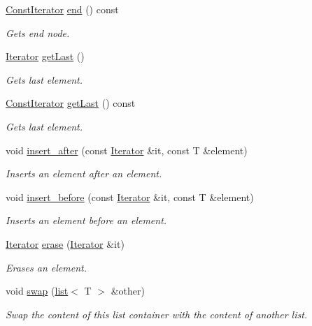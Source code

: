 \begin{DoxyCompactItemize}
\hyperlink{classirr_1_1core_1_1list_1_1ConstIterator}{Const\+Iterator} \hyperlink{classirr_1_1core_1_1list_a68b3da8c4e3e283ac6fd73a71d7a49bf}{end} () const 
\begin{DoxyCompactList}\small\item\em Gets end node. \end{DoxyCompactList}\item 
\hyperlink{classirr_1_1core_1_1list_1_1Iterator}{Iterator} \hyperlink{classirr_1_1core_1_1list_a6ba09d4c7865a451e40b5bd5f4c2dd50}{get\+Last} ()
\begin{DoxyCompactList}\small\item\em Gets last element. \end{DoxyCompactList}\item 
\hyperlink{classirr_1_1core_1_1list_1_1ConstIterator}{Const\+Iterator} \hyperlink{classirr_1_1core_1_1list_a23497b9de2726df5ec64c457470d49a0}{get\+Last} () const 
\begin{DoxyCompactList}\small\item\em Gets last element. \end{DoxyCompactList}\item 
void \hyperlink{classirr_1_1core_1_1list_aa4b91d7a9191fc98266425366b774c8a}{insert\+\_\+after} (const \hyperlink{classirr_1_1core_1_1list_1_1Iterator}{Iterator} \&it, const T \&element)
\begin{DoxyCompactList}\small\item\em Inserts an element after an element. \end{DoxyCompactList}\item 
void \hyperlink{classirr_1_1core_1_1list_a366070e0356029f0b355f5dd81710b29}{insert\+\_\+before} (const \hyperlink{classirr_1_1core_1_1list_1_1Iterator}{Iterator} \&it, const T \&element)
\begin{DoxyCompactList}\small\item\em Inserts an element before an element. \end{DoxyCompactList}\item 
\hyperlink{classirr_1_1core_1_1list_1_1Iterator}{Iterator} \hyperlink{classirr_1_1core_1_1list_a407935fc79a35ce7caa19e4f6ce25c3f}{erase} (\hyperlink{classirr_1_1core_1_1list_1_1Iterator}{Iterator} \&it)
\begin{DoxyCompactList}\small\item\em Erases an element. \end{DoxyCompactList}\item 
void \hyperlink{classirr_1_1core_1_1list_a860e4dab70f2ac5f13b9385f7f63d5b9}{swap} (\hyperlink{classirr_1_1core_1_1list}{list}$<$ T $>$ \&other)
\begin{DoxyCompactList}\small\item\em Swap the content of this list container with the content of another list. \end{DoxyCompactList}\end{DoxyCompactItemize}


